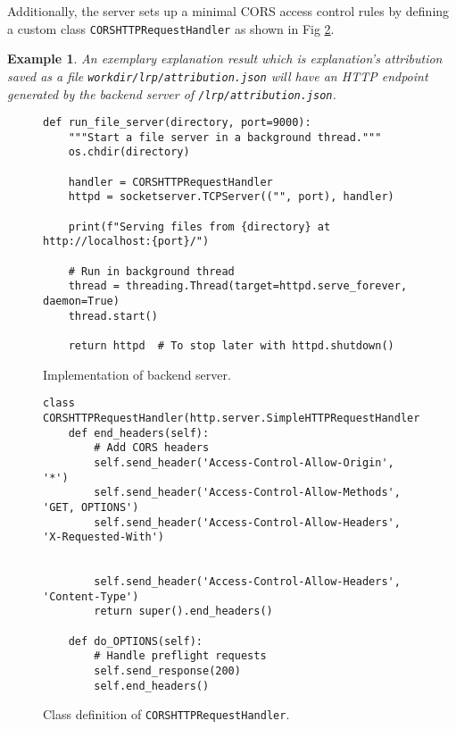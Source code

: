 \documentclass[
    bindingoffset=5mm,  %
    footnoteindent=3mm, %
    hyphenation=true    %
]{src/wut-thesis}
\newtheorem{example}{Example}
\begin{document}
Additionally, the server sets up a minimal CORS access control rules by defining a custom
class \texttt{CORSHTTPRequestHandler} as shown in Fig \ref{fig:CORSHTTPRequestHandler}.

\begin{example}
    An exemplary explanation result which is explanation's attribution saved as a file \texttt{workdir/lrp/attribution.json}
    will have an HTTP endpoint generated by the backend server of \texttt{/lrp/attribution.json}.
\end{example}

\begin{figure}%
\begin{verbatim}
def run_file_server(directory, port=9000):
    """Start a file server in a background thread."""
    os.chdir(directory)

    handler = CORSHTTPRequestHandler
    httpd = socketserver.TCPServer(("", port), handler)

    print(f"Serving files from {directory} at http://localhost:{port}/")

    # Run in background thread
    thread = threading.Thread(target=httpd.serve_forever, daemon=True)
    thread.start()

    return httpd  # To stop later with httpd.shutdown()

\end{verbatim}
\caption{Implementation of backend server.}
\label{fig:BackendServer}
\end{figure}

\begin{figure}%
\begin{verbatim}
class CORSHTTPRequestHandler(http.server.SimpleHTTPRequestHandler):
    def end_headers(self):
        # Add CORS headers
        self.send_header('Access-Control-Allow-Origin', '*')
        self.send_header('Access-Control-Allow-Methods', 'GET, OPTIONS')
        self.send_header('Access-Control-Allow-Headers', 'X-Requested-With')

        
        self.send_header('Access-Control-Allow-Headers', 'Content-Type')
        return super().end_headers()

    def do_OPTIONS(self):
        # Handle preflight requests
        self.send_response(200)
        self.end_headers()
\end{verbatim}
\caption{Class definition of \texttt{CORSHTTPRequestHandler}.}
\label{fig:CORSHTTPRequestHandler}
\end{figure}
\end{document}
